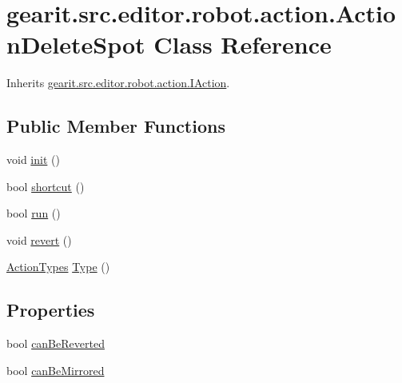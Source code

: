 \hypertarget{classgearit_1_1src_1_1editor_1_1robot_1_1action_1_1_action_delete_spot}{\section{gearit.\+src.\+editor.\+robot.\+action.\+Action\+Delete\+Spot Class Reference}
\label{classgearit_1_1src_1_1editor_1_1robot_1_1action_1_1_action_delete_spot}
}


Inherits \hyperlink{interfacegearit_1_1src_1_1editor_1_1robot_1_1action_1_1_i_action}{gearit.\+src.\+editor.\+robot.\+action.\+I\+Action}.

\subsection*{Public Member Functions}
\begin{DoxyCompactItemize}
\item 
void \hyperlink{classgearit_1_1src_1_1editor_1_1robot_1_1action_1_1_action_delete_spot_a0c0dfa39fc3bd0752e4ea3953bed997c}{init} ()
\item 
bool \hyperlink{classgearit_1_1src_1_1editor_1_1robot_1_1action_1_1_action_delete_spot_a777fb546c2b816e5b33d15cac2388fb3}{shortcut} ()
\item 
bool \hyperlink{classgearit_1_1src_1_1editor_1_1robot_1_1action_1_1_action_delete_spot_a6d29d506f4acbc69c211be14c9619a3e}{run} ()
\item 
void \hyperlink{classgearit_1_1src_1_1editor_1_1robot_1_1action_1_1_action_delete_spot_ae66a878d9ce0621787e3aff21a345800}{revert} ()
\item 
\hyperlink{namespacegearit_1_1src_1_1editor_1_1robot_1_1action_a4be0fd46e3952d6135136b20e7b3fc5e}{Action\+Types} \hyperlink{classgearit_1_1src_1_1editor_1_1robot_1_1action_1_1_action_delete_spot_a893508a91e7a4eb7a90e40b839f15e4f}{Type} ()
\end{DoxyCompactItemize}
\subsection*{Properties}
\begin{DoxyCompactItemize}
\item 
bool \hyperlink{classgearit_1_1src_1_1editor_1_1robot_1_1action_1_1_action_delete_spot_a8800ec512028bce443bba953699f52d5}{can\+Be\+Reverted}
\item 
bool \hyperlink{classgearit_1_1src_1_1editor_1_1robot_1_1action_1_1_action_delete_spot_a59ad38e82309821a051d4d63334364b2}{can\+Be\+Mirrored}
\end{DoxyCompactItemize}



